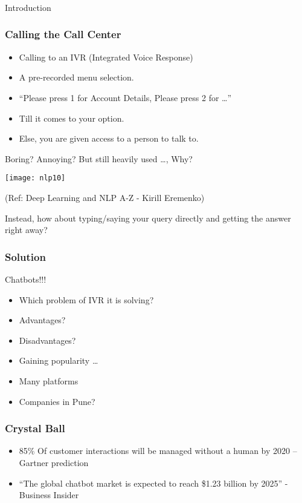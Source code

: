 \begin{frame}[fragile]\frametitle{}
\begin{center}
{\Large Introduction}
\end{center}
\end{frame}


\begin{frame}[fragile]\frametitle{Calling the Call Center}
	\begin{itemize}
	\item Calling to an IVR (Integrated Voice Response)
	\item A pre-recorded menu selection.
	\item ``Please press 1 for Account Details, Please press 2 for \ldots''
	\item Till it comes to your option. 
	\item Else, you are given access to a person to talk to.
	\end{itemize}

Boring? Annoying? But still heavily used \ldots, Why?

\begin{center}
\texttt{[image: nlp10]}

\tiny{(Ref: Deep Learning and NLP A-Z - Kirill Eremenko)}
\end{center}
Instead, how about typing/saying your query directly and getting the answer right away?

\end{frame}

\begin{frame}[fragile]\frametitle{Solution}
Chatbots!!!

	\begin{itemize}
	\item Which problem of IVR it is solving?
	\item Advantages?
	\item Disadvantages?
	\item Gaining popularity \ldots
	\item Many platforms
	\item Companies in Pune?
	\end{itemize}


\end{frame}

\begin{frame}[fragile]\frametitle{Crystal Ball}

\begin{itemize}
\item 85\% Of customer interactions will be managed without a human by 2020 – Gartner prediction

\item ``The global chatbot market is expected to reach \$1.23 billion by 2025'' - Business Insider
\end{itemize}

\end{frame}

